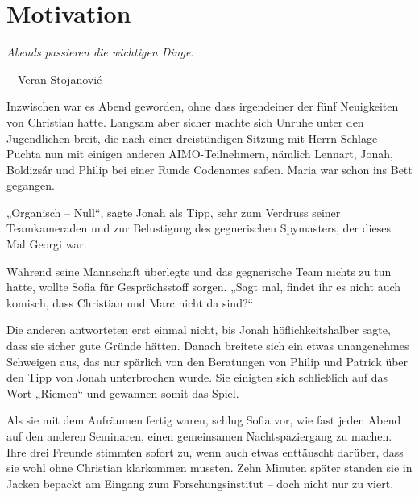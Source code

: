 \documentclass[oneside]{memoir}
\makeatletter
\newenvironment{chapquote}[2][2em]
  {\setlength{\@tempdima}{#1}%
   \def\chapquote@author{#2}%
   \parshape 1 \@tempdima \dimexpr\textwidth-2\@tempdima\relax%
   \itshape}
  {\par\normalfont\hfill--\ \chapquote@author\hspace*{\@tempdima}\par\bigskip}
\makeatother
\begin{document}
\chapter{Motivation} %
\begin{chapquote}{Veran Stojanović}
\glqq Abends passieren die wichtigen Dinge.\grqq
\end{chapquote}

Inzwischen war es Abend geworden, ohne dass irgendeiner der fünf Neuigkeiten von Christian hatte. Langsam aber sicher machte sich Unruhe unter den Jugendlichen breit, die nach einer dreistündigen Sitzung mit Herrn Schlage-Puchta nun mit einigen anderen AIMO-Teilnehmern, nämlich Lennart, Jonah, Boldizsár und Philip bei einer Runde Codenames saßen. Maria war schon ins Bett gegangen.

„Organisch – Null“, sagte Jonah als Tipp, sehr zum Verdruss seiner Teamkameraden und zur Belustigung des gegnerischen Spymasters, der dieses Mal Georgi war.

Während seine Mannschaft überlegte und das gegnerische Team nichts zu tun hatte, wollte Sofia für Gesprächsstoff sorgen. „Sagt mal, findet ihr es nicht auch komisch, dass Christian und Marc nicht da sind?“

Die anderen antworteten erst einmal nicht, bis Jonah höflichkeitshalber sagte, dass sie sicher gute Gründe hätten. Danach breitete sich ein etwas unangenehmes Schweigen aus, das nur spärlich von den Beratungen von Philip und Patrick über den Tipp von Jonah unterbrochen wurde. Sie einigten sich schließlich auf das Wort „Riemen“ und gewannen somit das Spiel.

Als sie mit dem Aufräumen fertig waren, schlug Sofia vor, wie fast jeden Abend auf den anderen Seminaren, einen gemeinsamen Nachtspaziergang zu machen. Ihre drei Freunde stimmten sofort zu, wenn auch etwas enttäuscht darüber, dass sie wohl ohne Christian klarkommen mussten. Zehn Minuten später standen sie in Jacken bepackt am Eingang zum Forschungsinstitut – doch nicht nur zu viert.
\end{document}
